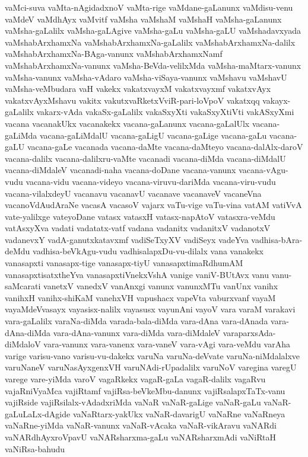 {vaMci-suva
vaMta-nAgidadxnoV
vaMta-rige
vaMdane-gaLanunx
vaMdisu-venu
vaMdeV
vaMdhAyx
vaMvitf
vaMsha
vaMshaM
vaMshaH
vaMsha-gaLanunx
vaMsha-gaLalilx
vaMsha-gaLAgive
vaMsha-gaLu
vaMsha-gaLU
vaMshadavxyada
vaMshabArxhamxNa
vaMshabArxhamxNa-gaLalilx
vaMshabArxhamxNa-dalilx
vaMshabArxhamxNa-BAga-vanunx
vaMshabArxhamxNamf
vaMshabArxhamxNa-vanunx
vaMsha-BeVda-velilxMda
vaMsha-maMtarx-vanunx
vaMsha-vanunx
vaMsha-vAdaro
vaMsha-viSaya-vanunx
vaMshavu
vaMshavU
vaMsha-veMbudara
vaH
vakekx
vakatxvayxM
vakatxvayxmf
vakatxvAyx
vakatxvAyxMshavu
vakitx
vakutxvaRketxVviR-pari-loVpoV
vakatxqq
vakayx-gaLalilx
vakarx-vAda
vakaSx-gaLalilx
vakaSxyXti
vakaSxyXtiVti
vakASxyXmi
vacana
vacanakUkx
vacanakekx
vacana-gaLanunx
vacana-gaLalUlx
vacana-gaLiMda
vacana-gaLiMdalU
vacana-gaLigU
vacana-gaLige
vacana-gaLu
vacana-gaLU
vacana-gaLe
vacanada
vacana-daMte
vacana-daMteyo
vacana-dalAlx-daroV
vacana-dalilx
vacana-dalilxru-vaMte
vacanadi
vacana-diMda
vacana-diMdalU
vacana-diMdaleV
vacanadi-naha
vacana-doDane
vacana-vanunx
vacana-vAgu-vudu
vacana-vidu
vacana-videyo
vacana-viruvu-dariMda
vacana-viru-vudu
vacana-vilalxdeyU
vacanavu
vacanavU
vacanave
vacanaveV
vacaneVna
vacanoVdAudAraNe
vacasA
vacasoV
vajarx
vaTu-vige
vaTu-vina
vatAM
vatiVvA
vate-yalilxge
vateyoDane
vatasx
vatasxH
vatasx-napAtoV
vatasxra-veMdu
vatAsxyXva
vadati
vadatatx-vatf
vadana
vadanitx
vadanitxV
vadanotxV
vadanevxY
vadA-ganutxkatavxmf
vadiSeTxyXV
vadiSeyx
vadeYva
vadhisa-bAra-deMdu
vadhisa-beVkAgu-vudu
vadhisalapxDu-vu-dilalx
vana
vanakekx
vanasapxti
vanasapx-tige
vanasapx-tiyU
vanasapxtimaRdhumAM
vanasapxtisatxtheYva
vanasapxtiVnekxVshA
vanige
vaniV-BUtAvx
vanu
vanu-saMcarati
vanetxV
vanedxV
vanAnxgi
vanunx
vanunxMTu
vanUnx
vanihx
vanihxH
vanihx-shiKaM
vanehxVH
vapushacx
vapeVta
vaburxvanf
vayaM
vayaMdeVvasayx
vayasisx-nalilx
vayasusx
vayunAni
vayoV
vara
varaM
varakavi
vara-gaLalilx
varaNa-diMda
varada-bala-diMda
vara-dAna
vara-dAnada
vara-dAna-diMda
vara-dAna-vanunx
vara-diMda
vara-diMdaleV
varaparxsAda-diMdaloV
vara-vanunx
vara-vanenx
vara-vaneV
vara-vAgi
vara-veMdu
varAha
varige
varisu-vano
varisu-vu-dakekx
varuNa
varuNa-deVvate
varuNa-niMdalalxve
varuNaneV
varuNasAyxgenxVH
varuNAdi-rUpadalilx
varuNoV
varegina
varegU
varege
vare-yiMda
varoV
vagaRkekx
vagaR-gaLa
vagaR-dalilx
vagaRvu
vajaRniVyaMca
vajiRtamf
vajiRsa-beVkeMbu-danunx
vajiRsalapxTaTx-vanu
vajiRside
vajiRsilalx-vAdadxriMda
vaNaR
vaNaR-gaLige
vaNaR-gaLu
vaNaR-gaLuLaLx-dAgide
vaNaRtarx-yakUkx
vaNaR-davarigU
vaNaRne
vaNaRneya
vaNaRne-yiMda
vaNaR-vanunx
vaNaR-vAcaka
vaNaR-vikAravu
vaNARdi
vaNARdhAyxroVpavU
vaNARsharxma-gaLu
vaNARsharxmAdi
vaNiRtaH
vaNiRsa-bahudu
}
